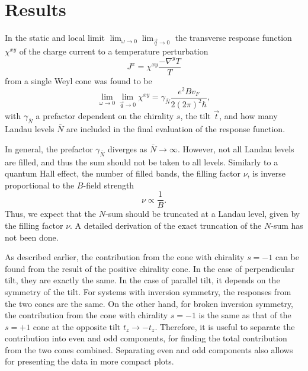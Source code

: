 \FloatBarrier
\section{Results}
In the static and local limit $\lim_{\omega \to 0} \lim_{\vec{q}\to 0}$ the  transverse response function $\chi^{xy}$ of the charge current to a temperature perturbation
\begin{equation}
  J^x = \chi^{xy} \frac{- \nabla^y T}{T}
\end{equation}
from a single Weyl cone was found  to be
\begin{equation}
  \lim_{\omega \to 0} \lim_{\vec{q}\to 0}
  \chi^{xy}
  =
  \gamma_{\bar{N}}
  \frac{e^2 B v_F}{2 (2\pi )^2 \hbar },
\end{equation}
with $\gamma _{\bar{N}}$ a prefactor dependent on the chirality \( s \), the tilt \( \vec{t} \), and  how many Landau levels \( \bar{N} \) are included in the final evaluation of the response function.

In general, the prefactor \( \gamma_{\bar{N}} \) diverges as $\bar{N} \to \infty$.
However, not all Landau levels are filled, and thus the sum should not be taken to all levels.
Similarly to a quantum Hall effect, the number of filled bands, the filling factor $\nu $, is inverse proportional to the $B$-field strength
\begin{equation}
  \nu \propto \frac{1}{B}.
\end{equation}
Thus, we expect that the $N$-sum should be truncated at a Landau level, given by the filling factor $\nu $.
A detailed derivation of the exact truncation of the $N$-sum has not been done.

As described earlier, the contribution from the cone with chirality \( s = -1 \) can be found from the result of the positive chirality cone.
In the case of perpendicular tilt, they are exactly the same.
In the case of parallel tilt, it depends on the symmetry of the tilt.
For systems with inversion symmetry, the responses from the two cones are the same.
On the other hand, for broken inversion symmetry, the contribution from the cone with chirality \( s=-1 \) is the same as that of the \( s=+1 \) cone at the opposite tilt \( t_z \to - t_z \).
Therefore, it is useful to separate the contribution into even and odd components, for finding the total contribution from the two cones combined.
Separating even and odd components also allows for presenting the data in more compact plots.


